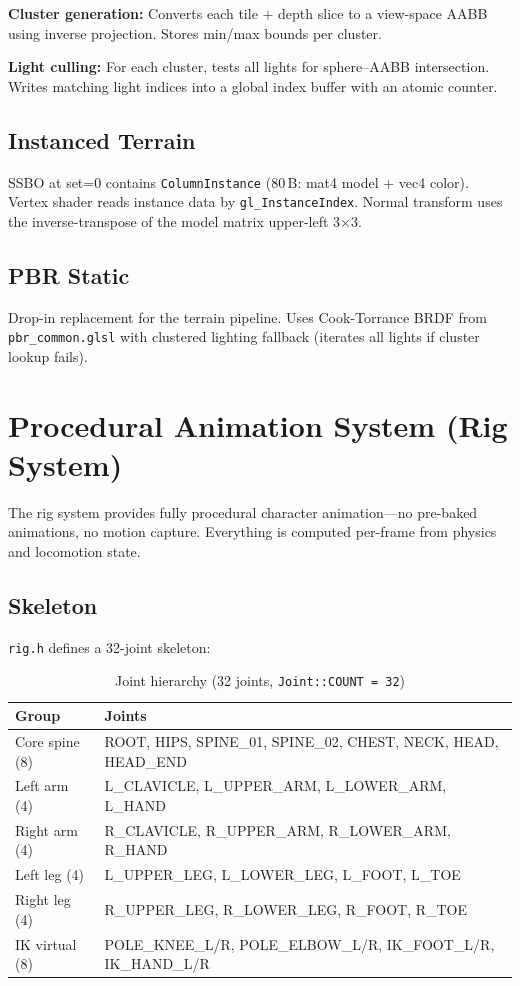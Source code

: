 \documentclass[11pt,a4paper]{article}
\begin{document}
\textbf{Cluster generation:} Converts each tile + depth slice to a view-space AABB using inverse projection. Stores min/max bounds per cluster.

\textbf{Light culling:} For each cluster, tests all lights for sphere--AABB intersection. Writes matching light indices into a global index buffer with an atomic counter.

\subsection{Instanced Terrain}

SSBO at set=0 contains \texttt{ColumnInstance} (80\,B: mat4 model + vec4 color). Vertex shader reads instance data by \texttt{gl\_InstanceIndex}. Normal transform uses the inverse-transpose of the model matrix upper-left 3$\times$3.

\subsection{PBR Static}

Drop-in replacement for the terrain pipeline. Uses Cook-Torrance BRDF from \texttt{pbr\_common.glsl} with clustered lighting fallback (iterates all lights if cluster lookup fails).

\section{Procedural Animation System (Rig System)}
\label{sec:animation}

The rig system provides fully procedural character animation---no pre-baked animations, no motion capture. Everything is computed per-frame from physics and locomotion state.

\subsection{Skeleton}

\texttt{rig.h} defines a 32-joint skeleton:

\begin{table}[h]
\centering
\caption{Joint hierarchy (32 joints, \texttt{Joint::COUNT = 32})}
\label{tab:joints}
\begin{tabular}{@{}lp{9cm}@{}}
\toprule
\textbf{Group} & \textbf{Joints} \\
\midrule
Core spine (8) & ROOT, HIPS, SPINE\_01, SPINE\_02, CHEST, NECK, HEAD, HEAD\_END \\
Left arm (4)   & L\_CLAVICLE, L\_UPPER\_ARM, L\_LOWER\_ARM, L\_HAND \\
Right arm (4)  & R\_CLAVICLE, R\_UPPER\_ARM, R\_LOWER\_ARM, R\_HAND \\
Left leg (4)   & L\_UPPER\_LEG, L\_LOWER\_LEG, L\_FOOT, L\_TOE \\
Right leg (4)  & R\_UPPER\_LEG, R\_LOWER\_LEG, R\_FOOT, R\_TOE \\
IK virtual (8) & POLE\_KNEE\_L/R, POLE\_ELBOW\_L/R, IK\_FOOT\_L/R, IK\_HAND\_L/R \\
\bottomrule
\end{tabular}
\end{table}
\end{document}
